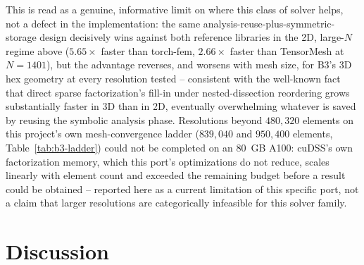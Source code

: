 \documentclass[final,5p,times]{elsarticle}
\begin{document}
This is read as a genuine, informative limit on where this class of
solver helps, not a defect in the implementation: the same
analysis-reuse-plus-symmetric-storage design decisively wins against
both reference libraries in the 2D, large-$N$ regime above ($5.65\times$
faster than torch-fem, $2.66\times$ faster than TensorMesh at
$N{=}1401$), but the advantage reverses, and worsens with mesh size, for
B3's 3D hex geometry at every resolution tested -- consistent with the
well-known fact that direct sparse factorization's fill-in under
nested-dissection reordering grows substantially faster in 3D than in
2D, eventually overwhelming whatever is saved by reusing the symbolic
analysis phase. Resolutions beyond $480{,}320$ elements on this
project's own mesh-convergence ladder ($839{,}040$ and $950{,}400$
elements, Table~\ref{tab:b3-ladder}) could not be completed on an
$80$~GB A100: cuDSS's own factorization memory, which this port's
optimizations do not reduce, scales linearly with element count and
exceeded the remaining budget before a result could be obtained --
reported here as a current limitation of this specific port, not a
claim that larger resolutions are categorically infeasible for this
solver family.

\FloatBarrier
\section{Discussion}
\label{sec:discussion}
\end{document}
